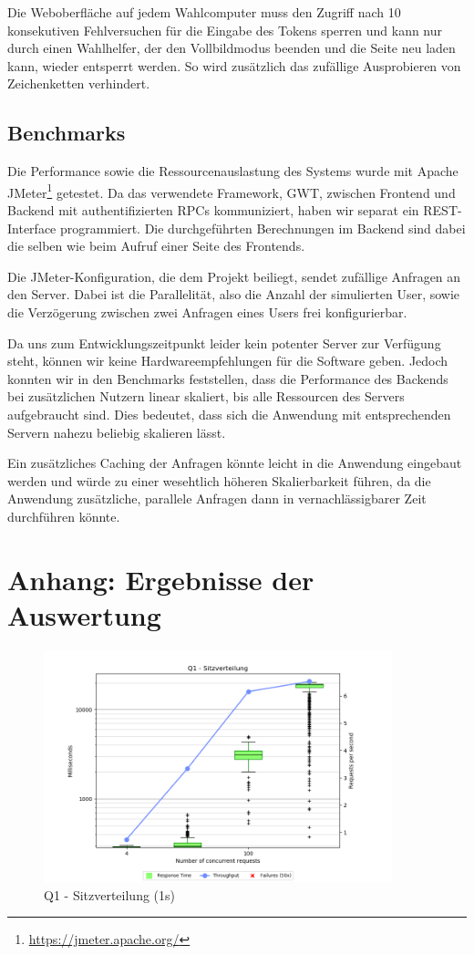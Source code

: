\documentclass[a4paper]{scrreprt}
\begin{document}
Die Weboberfläche auf jedem Wahlcomputer muss den Zugriff nach 10 konsekutiven Fehlversuchen für die Eingabe des Tokens sperren und kann nur durch einen Wahlhelfer, der den Vollbildmodus beenden und die Seite neu laden kann, wieder entsperrt werden.
So wird zusätzlich das zufällige Ausprobieren von Zeichenketten verhindert.

\section{Benchmarks}

Die Performance sowie die Ressourcenauslastung des Systems wurde mit Apache JMeter\footnote{\url{https://jmeter.apache.org/}} getestet.
Da das verwendete Framework, GWT, zwischen Frontend und Backend mit authentifizierten RPCs kommuniziert, haben wir separat ein REST-Interface programmiert.
Die durchgeführten Berechnungen im Backend sind dabei die selben wie beim Aufruf einer Seite des Frontends.

Die JMeter-Konfiguration, die dem Projekt beiliegt, sendet zufällige Anfragen an den Server.
Dabei ist die Parallelität, also die Anzahl der simulierten User, sowie die Verzögerung zwischen zwei Anfragen eines Users frei konfigurierbar.

Da uns zum Entwicklungszeitpunkt leider kein potenter Server zur Verfügung steht, können wir keine Hardwareempfehlungen für die Software geben.
Jedoch konnten wir in den Benchmarks feststellen, dass die Performance des Backends bei zusätzlichen Nutzern linear skaliert, bis alle Ressourcen des Servers aufgebraucht sind.
Dies bedeutet, dass sich die Anwendung mit entsprechenden Servern nahezu beliebig skalieren lässt.

Ein zusätzliches Caching der Anfragen könnte leicht in die Anwendung eingebaut werden und würde zu einer wesehtlich höheren Skalierbarkeit führen, da die Anwendung zusätzliche, parallele Anfragen dann in vernachlässigbarer Zeit durchführen könnte.

\chapter{Anhang: Ergebnisse der Auswertung}

\begin{figure}[h]
\centering
\includegraphics[width=0.9\textwidth]{images/plots_1s/Q1}
\caption {Q1 - Sitzverteilung (1s)}
\end{figure}
\end{document}
